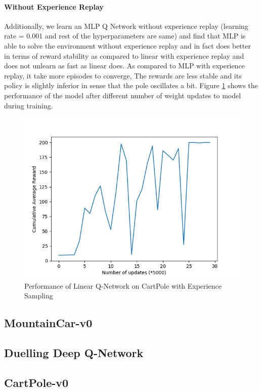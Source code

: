 \documentclass[12pt]{article}
\begin{document}
\paragraph{Without Experience Replay} Additionally, we learn an MLP Q Network without experience replay (learning rate = 0.001 and rest of the hyperparameters are same) and find that MLP is able to solve the environment without experience replay and in fact does better in terms of reward stability as compared to linear with experience replay and does not unlearn as fast as linear does. As compared to MLP with experience replay, it take more episodes to converge, The rewards are less stable and its policy is slightly inferior in sense that the pole oscillates a bit. Figure \ref{fig:04} shows the performance of the model after different number of weight updates to model during training.

\begin{figure}[h]
  \centering
  \vspace{-5mm}
  \includegraphics[width=0.8\linewidth]{figures/reward_plot_03.png}
  \caption{Performance of Linear Q-Network on CartPole with Experience Sampling}
  \label{fig:04}
\end{figure}

\pagebreak[4]
\subsection*{MountainCar-v0}

\pagebreak[4]
\subsection{Duelling Deep Q-Network}
\subsection*{CartPole-v0}
\end{document}

